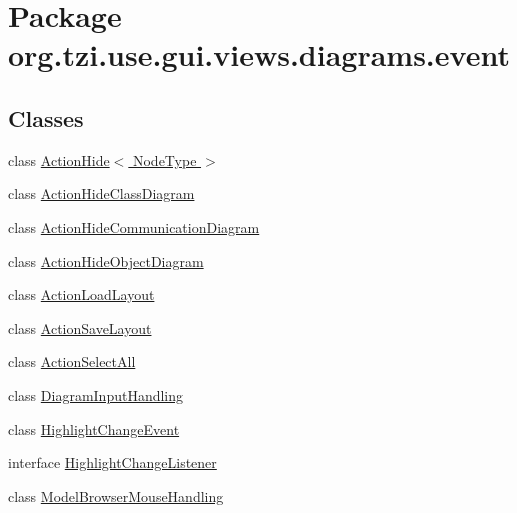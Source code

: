 \hypertarget{namespaceorg_1_1tzi_1_1use_1_1gui_1_1views_1_1diagrams_1_1event}{\section{Package org.\-tzi.\-use.\-gui.\-views.\-diagrams.\-event}
\label{namespaceorg_1_1tzi_1_1use_1_1gui_1_1views_1_1diagrams_1_1event}
}
\subsection*{Classes}
\begin{DoxyCompactItemize}
\item 
class \hyperlink{classorg_1_1tzi_1_1use_1_1gui_1_1views_1_1diagrams_1_1event_1_1_action_hide_3_01_node_type_01_4}{Action\-Hide$<$ Node\-Type $>$}
\item 
class \hyperlink{classorg_1_1tzi_1_1use_1_1gui_1_1views_1_1diagrams_1_1event_1_1_action_hide_class_diagram}{Action\-Hide\-Class\-Diagram}
\item 
class \hyperlink{classorg_1_1tzi_1_1use_1_1gui_1_1views_1_1diagrams_1_1event_1_1_action_hide_communication_diagram}{Action\-Hide\-Communication\-Diagram}
\item 
class \hyperlink{classorg_1_1tzi_1_1use_1_1gui_1_1views_1_1diagrams_1_1event_1_1_action_hide_object_diagram}{Action\-Hide\-Object\-Diagram}
\item 
class \hyperlink{classorg_1_1tzi_1_1use_1_1gui_1_1views_1_1diagrams_1_1event_1_1_action_load_layout}{Action\-Load\-Layout}
\item 
class \hyperlink{classorg_1_1tzi_1_1use_1_1gui_1_1views_1_1diagrams_1_1event_1_1_action_save_layout}{Action\-Save\-Layout}
\item 
class \hyperlink{classorg_1_1tzi_1_1use_1_1gui_1_1views_1_1diagrams_1_1event_1_1_action_select_all}{Action\-Select\-All}
\item 
class \hyperlink{classorg_1_1tzi_1_1use_1_1gui_1_1views_1_1diagrams_1_1event_1_1_diagram_input_handling}{Diagram\-Input\-Handling}
\item 
class \hyperlink{classorg_1_1tzi_1_1use_1_1gui_1_1views_1_1diagrams_1_1event_1_1_highlight_change_event}{Highlight\-Change\-Event}
\item 
interface \hyperlink{interfaceorg_1_1tzi_1_1use_1_1gui_1_1views_1_1diagrams_1_1event_1_1_highlight_change_listener}{Highlight\-Change\-Listener}
\item 
class \hyperlink{classorg_1_1tzi_1_1use_1_1gui_1_1views_1_1diagrams_1_1event_1_1_model_browser_mouse_handling}{Model\-Browser\-Mouse\-Handling}
\end{DoxyCompactItemize}
